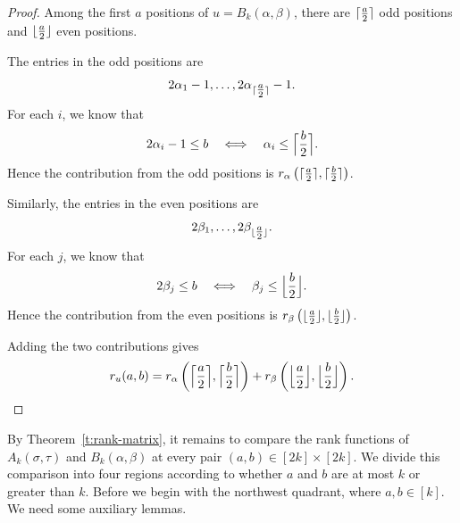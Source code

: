 \documentclass[12pt]{amsart}
\DeclarePairedDelimiter\ceil{\lceil}{\rceil}
\DeclarePairedDelimiter\floor{\lfloor}{\rfloor}
\theoremstyle{definition}
\numberwithin{equation}{section}
\begin{document}
\begin{proof}
Among the first $a$ positions of $u=B_k(\alpha,\beta)$, there are
$\ceil{\tfrac{a}{2}}$ odd positions and
$\floor{\tfrac{a}{2}}$ even positions.

The entries in the odd positions are
\begin{equation*}
2\alpha_1-1,\ldots,
2\alpha_{\ceil{\tfrac{a}{2}}}-1.
\end{equation*}
For each $i$, we know that
\begin{equation*}
2\alpha_i-1\leq b
\quad\Longleftrightarrow\quad
\alpha_i\leq \ceil[\Big]{\frac{b}{2}}.
\end{equation*}
Hence the contribution from the odd positions is $r_\alpha\left(
\ceil{\tfrac{a}{2}},
\ceil{\tfrac{b}{2}}
\right)$.

Similarly, the entries in the even positions are
\begin{equation*}
2\beta_1,\ldots,
2\beta_{\floor{\tfrac{a}{2}}}.
\end{equation*}
For each $j$, we know that
\begin{equation*}
2\beta_j\leq b
\quad\Longleftrightarrow\quad
\beta_j\leq \floor[\Big]{\frac{b}{2}}.
\end{equation*}
Hence the contribution from the even positions is
$r_\beta\left(
\floor{\tfrac{a}{2}},
\floor{\tfrac{b}{2}}
\right)$.

Adding the two contributions gives
\begin{equation*}
r_u(a,b)
=
r_\alpha\left(
\ceil[\Big]{\frac{a}{2}},
\ceil[\Big]{\frac{b}{2}}
\right)
+
r_\beta\left(
\floor[\Big]{\frac{a}{2}},
\floor[\Big]{\frac{b}{2}}
\right).
\end{equation*}
\end{proof}

By Theorem~\ref{t:rank-matrix}, it remains to compare the
rank functions of $A_k(\sigma,\tau)$ and $B_k(\alpha,\beta)$ at every
pair $(a,b)\in[2k]\times[2k]$. We divide this comparison into four
regions according to whether $a$ and $b$ are at most $k$ or greater
than $k$. Before we begin with the northwest quadrant, where $a,b\in[k]$. We need some auxiliary lemmas.
\end{document}
